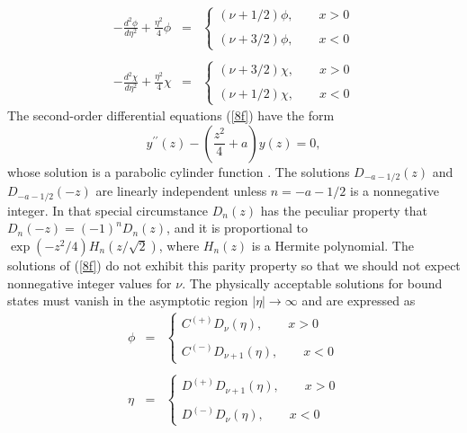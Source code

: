 \documentclass[a4paper,12pt,titlepage]{article}
\begin{document}
\begin{eqnarray}
-\frac{d^{2}\phi }{d\eta ^{2}}+\frac{\eta ^{2}}{4}\phi &=&\left\{ 
\begin{array}{l}
\left( \nu +1/2\right) \phi ,\qquad x>0 \\ 
\\ 
\left( \nu +3/2\right) \phi ,\qquad x<0
\end{array}
\right.  \nonumber \\
&&  \label{8f} \\
-\frac{d^{2}\chi }{d\eta ^{2}}+\frac{\eta ^{2}}{4}\chi &=&\left\{ 
\begin{array}{l}
\left( \nu +3/2\right) \chi ,\qquad x>0 \\ 
\\ 
\left( \nu +1/2\right) \chi ,\qquad x<0
\end{array}
\right.  \nonumber
\end{eqnarray}
\noindent The second-order differential equations (\ref{8f}) have the form 
\begin{equation}
y^{\prime \prime }(z)-\left( \frac{z^{2}}{4}+a\right) y(z)=0,  \label{eq9}
\end{equation}
whose solution is a parabolic cylinder function \cite{abr}. The solutions $%
D_{-a-1/2}(z)$ and $D_{-a-1/2}(-z)$ are linearly independent unless $%
n=-a-1/2 $ is a nonnegative integer. In that special circumstance $D_{n}(z)$
has the peculiar property that $D_{n}(-z)=(-1)^{n}D_{n}(z)$, and it is
proportional to $\exp \left( -z^{2}/4\right) H_{n}(z/\sqrt{2})$, where $%
H_{n}(z)$ is a Hermite polynomial. The solutions of (\ref{8f}) do not
exhibit this parity property so that we should not expect nonnegative
integer values for $\nu $. The physically acceptable solutions for bound
states must vanish in the asymptotic region $|\eta |\rightarrow \infty $ and
are expressed as 
\begin{eqnarray}
\phi &=&\left\{ 
\begin{array}{c}
C^{\left( +\right) }D_{\nu }(\eta ),\qquad x>0 \\ 
\\ 
C^{\left( -\right) }D_{\nu +1}(\eta ),\qquad x<0
\end{array}
\right.  \nonumber \\
&&  \label{eq10} \\
\eta &=&\left\{ 
\begin{array}{c}
D^{\left( +\right) }D_{\nu +1}(\eta ),\qquad x>0 \\ 
\\ 
D^{\left( -\right) }D_{\nu }(\eta ),\qquad x<0
\end{array}
\right.  \nonumber
\end{eqnarray}
\end{document}
